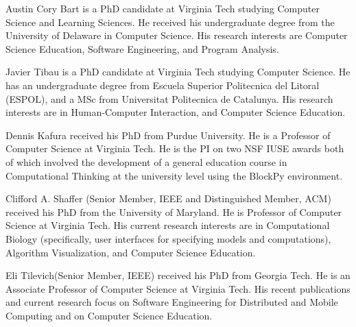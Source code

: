 \documentclass[10pt, conference, compsocconf]{IEEEtran}
\begin{document}



\printbibliography

\begin{IEEEbiography}{Austin Cory Bart}
is a PhD candidate at Virginia Tech studying Computer Science and Learning Sciences. He received his undergraduate degree from the University of Delaware in Computer Science. His research interests are Computer Science Education, Software Engineering, and Program Analysis.
\end{IEEEbiography}

\begin{IEEEbiography}{Javier Tibau}
is a PhD candidate at Virginia Tech studying Computer Science. He has an undergraduate degree from Escuela Superior Politecnica del Litoral (ESPOL), and a MSc from Universitat Politecnica de Catalunya. His research interests are in Human-Computer Interaction, and Computer Science Education.
\end{IEEEbiography}

\begin{IEEEbiography}{Dennis Kafura}
received his PhD from Purdue University. He is a Professor of Computer Science at Virginia Tech. He is the PI on two NSF IUSE awards both of which involved the development of a general education course in Computational Thinking at the university level using the BlockPy environment.
\end{IEEEbiography}

\begin{IEEEbiography}{Clifford A. Shaffer} (Senior Member, IEEE and Distinguished Member, ACM) received his PhD from the University of Maryland.
He is Professor of Computer Science at Virginia Tech.
His current research interests are in Computational Biology (specifically, user interfaces for specifying models and computations), Algorithm Visualization, and Computer Science Education.

\end{IEEEbiography}

\begin{IEEEbiography}{Eli Tilevich}(Senior Member, IEEE) received his PhD from Georgia Tech.
He is an Associate Professor of Computer Science at Virginia Tech. His recent publications and current research focus on Software Engineering for Distributed and Mobile Computing and on Computer Science Education.
\end{IEEEbiography}


\end{document}
